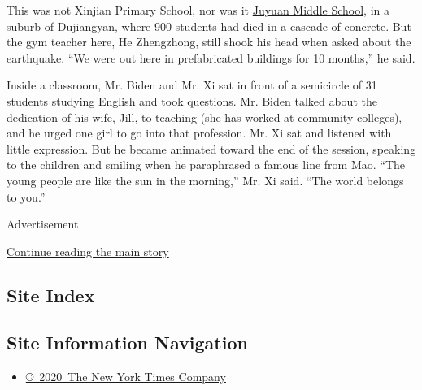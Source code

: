 This was not Xinjian Primary School, nor was it
\href{http://www.nytimes3xbfgragh.onion/2008/05/13/world/asia/13scene.html?ref=asia}{Juyuan
Middle School}, in a suburb of Dujiangyan, where 900 students had died
in a cascade of concrete. But the gym teacher here, He Zhengzhong, still
shook his head when asked about the earthquake. ``We were out here in
prefabricated buildings for 10 months,'' he said.

Inside a classroom, Mr. Biden and Mr. Xi sat in front of a semicircle of
31 students studying English and took questions. Mr. Biden talked about
the dedication of his wife, Jill, to teaching (she has worked at
community colleges), and he urged one girl to go into that profession.
Mr. Xi sat and listened with little expression. But he became animated
toward the end of the session, speaking to the children and smiling when
he paraphrased a famous line from Mao. ``The young people are like the
sun in the morning,'' Mr. Xi said. ``The world belongs to you.''

Advertisement

\protect\hyperlink{after-bottom}{Continue reading the main story}

\hypertarget{site-index}{%
\subsection{Site Index}\label{site-index}}

\hypertarget{site-information-navigation}{%
\subsection{Site Information
Navigation}\label{site-information-navigation}}

\begin{itemize}
\tightlist
\item
  \href{https://help.nytimes3xbfgragh.onion/hc/en-us/articles/115014792127-Copyright-notice}{©~2020~The
  New York Times Company}
\end{itemize}

